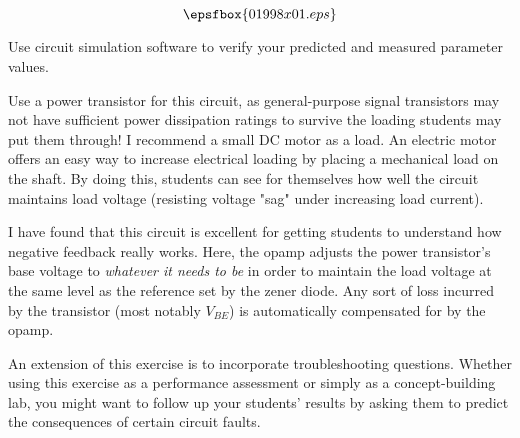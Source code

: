 

$$\epsfbox{01998x01.eps}$$

\vfil \eject






Use circuit simulation software to verify your predicted and measured parameter values.







Use a power transistor for this circuit, as general-purpose signal transistors may not have sufficient power dissipation ratings to survive the loading students may put them through!  I recommend a small DC motor as a load.  An electric motor offers an easy way to increase electrical loading by placing a mechanical load on the shaft.  By doing this, students can see for themselves how well the circuit maintains load voltage (resisting voltage "sag" under increasing load current).

I have found that this circuit is excellent for getting students to understand how negative feedback really works.  Here, the opamp adjusts the power transistor's base voltage to {\it whatever it needs to be} in order to maintain the load voltage at the same level as the reference set by the zener diode.  Any sort of loss incurred by the transistor (most notably $V_{BE}$) is automatically compensated for by the opamp.

An extension of this exercise is to incorporate troubleshooting questions.  Whether using this exercise as a performance assessment or simply as a concept-building lab, you might want to follow up your students' results by asking them to predict the consequences of certain circuit faults.




